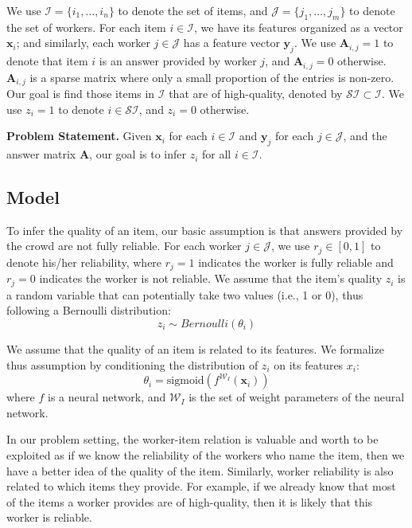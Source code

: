 \documentclass{article}
\begin{document}
We use $\mathcal{I} = \{i_1, \ldots, i_n\}$ to denote the set of items, and  $\mathcal{J} = \{j_1, \ldots, j_m \}$ to denote the set of workers. For each item $i \in \mathcal{I}$, we have its features organized as a vector $\mathbf{x}_i$; and similarly, each worker $j \in \mathcal{J}$ has a feature vector $\mathbf{y}_j$. We use $\mathbf{A}_{i,j}=1$ to denote that item $i$ is an answer provided by worker $j$, and $\mathbf{A}_{i,j}=0$ otherwise. $\mathbf{A}_{i,j}$ is a sparse matrix where only a small proportion of the entries is non-zero. Our goal is find those items in $\mathcal{I}$ that are of high-quality, denoted by $\mathcal{SI} \subset \mathcal{I}$. We use $z_i = 1$ to denote $i\in \mathcal{SI}$, and $z_i = 0$ otherwise.

\smallskip
\noindent\textbf{Problem Statement.} Given $\mathbf{x}_i$ for each $i\in \mathcal{I}$ and $\mathbf{y}_j$ for each $j\in \mathcal{J}$, and the answer matrix $\mathbf{A}$, our goal is to infer $z_i$ for all $i\in \mathcal{I}$.
\subsection{Model}
To infer the quality of an item, our basic assumption is that answers provided by the crowd are not fully reliable. For each worker $j\in \mathcal{J}$, we use $r_j \in [0,1]$ to denote his/her reliability, where $r_j=1$ indicates the worker is fully reliable and $r_j=0$ indicates the worker is not reliable.
We assume that the item's quality $z_i$ is a random variable that can potentially take two values (i.e., 1 or 0), thus following a Bernoulli distribution:
\begin{equation}
    z_i \sim Bernoulli(\theta_i)
    \label{eq:dis_item}
\end{equation}

We assume that the quality of an item is related to its features. We formalize thus assumption by conditioning the distribution of $z_i$ on its features $x_i$:
\begin{equation}
    \theta_i  = \text{sigmoid} (f^{\mathcal{W}_I}(\mathbf{x}_i))
    \label{eq:item_features}
\end{equation}
where $f$ is a neural network, and $\mathcal{W}_I$ is the set of weight parameters of the neural network.

In our problem setting, the worker-item relation is valuable and worth to be exploited as if we know the reliability of the workers who name the item, then we have a better idea of the quality of the item. Similarly, worker reliability
is also related to which items they provide. For example, if we already know that most of the items a worker provides are of high-quality, then it is likely that this worker is reliable. 
\end{document}
